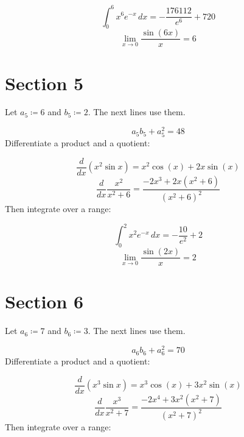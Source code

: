 \documentclass[11pt,a4paper]{article}
\theoremstyle{plain}
\theoremstyle{definition}
\theoremstyle{remark}
\begin{document}
\begin{equation*}
  \int_0^{6} x^{6} e^{-x} \, dx = -\frac{176112}{e^{6}} + 720
\end{equation*}
\begin{equation*}
  \lim_{x \to 0} \frac{\sin(6 x)}{x} = 6
\end{equation*}
\section*{Section 5}

Let $a_{5} \coloneqq  6$ and $b_{5} \coloneqq  2$. The next lines use them.

\begin{equation*}
  a_{5} b_{5} + a_{5}^2 = 48
\end{equation*}
Differentiate a product and a quotient:

\begin{equation*}
  \frac{d}{dx} \left( x^{2} \sin x \right) = x^{2} \cos\left(x\right) + 2 x \sin\left(x\right)
\end{equation*}
\begin{equation*}
  \frac{d}{dx} \frac{x^{2}}{x^2 + 6} = \frac{-2 x^{3} + 2 x \left(x^{2} + 6\right)}{\left(x^{2} + 6\right)^{2}}
\end{equation*}
Then integrate over a range:

\begin{equation*}
  \int_0^{2} x^{2} e^{-x} \, dx = -\frac{10}{e^{2}} + 2
\end{equation*}
\begin{equation*}
  \lim_{x \to 0} \frac{\sin(2 x)}{x} = 2
\end{equation*}
\section*{Section 6}

Let $a_{6} \coloneqq  7$ and $b_{6} \coloneqq  3$. The next lines use them.

\begin{equation*}
  a_{6} b_{6} + a_{6}^2 = 70
\end{equation*}
Differentiate a product and a quotient:

\begin{equation*}
  \frac{d}{dx} \left( x^{3} \sin x \right) = x^{3} \cos\left(x\right) + 3 x^{2} \sin\left(x\right)
\end{equation*}
\begin{equation*}
  \frac{d}{dx} \frac{x^{3}}{x^2 + 7} = \frac{-2 x^{4} + 3 x^{2} \left(x^{2} + 7\right)}{\left(x^{2} + 7\right)^{2}}
\end{equation*}
Then integrate over a range:
\end{document}
